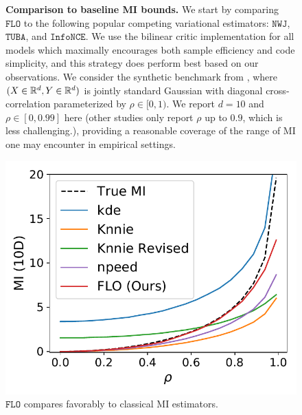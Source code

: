 \documentclass{article}
\theoremstyle{plain}
\theoremstyle{definition}
\theoremstyle{remark}
\newcommand{\infonce}{\texttt{InfoNCE}}
\newcommand{\TUBA}{\texttt{TUBA}}
\newcommand{\NWJ}{\texttt{NWJ}}
\newcommand{\FLO}{\texttt{FLO}}
\begin{document}
		
		
		\begin{figure}[H]
			\vspace{-1.em}
			\begin{minipage}{.65\textwidth}
				{\bf Comparison to baseline MI bounds.} We start by comparing $\FLO$ to the following popular competing variational estimators: $\NWJ$, $\TUBA$, and $\infonce$. We use the bilinear critic implementation for all models which maximally encourages both sample efficiency and code simplicity, and this strategy does perform best based on our observations. We consider the synthetic benchmark from \citep{poole2019variational}, where $(X\in\mathbb{R}^d,Y\in\mathbb{R}^d)$ is jointly standard Gaussian with diagonal cross-correlation parameterized by $\rho\in[0,1)$. We report $d=10$ and $\rho \in [0, 0.99]$ here (other studies only report $\rho$ up to $0.9$, which is less challenging.), providing a reasonable coverage of the range of MI one may encounter in empirical settings. 
			\end{minipage}
			\hspace{3pt}
			\begin{minipage}{.32\textwidth}
				\begin{center}
					\includegraphics[width=1\textwidth,trim={0 0 0.1in 0},clip]{figures/toy/kde-new}
				\end{center}
				\vspace{-1.8em}
				\caption{$\FLO$ compares favorably to classical MI estimators. \label{fig:classic}}
			\end{minipage}
			\vspace{-2.5em}
		\end{figure}
\end{document}
